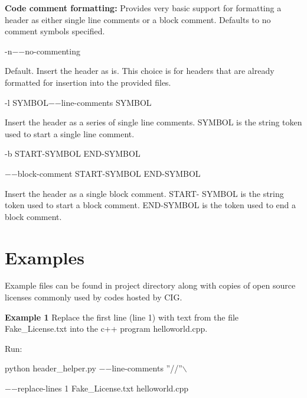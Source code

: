 \documentclass[11pt, oneside]{article}   	%
\begin{document}
\textbf{Code comment formatting:}\newline
Provides very basic support for formatting a header as either single line comments or a block comment. Defaults to no comment symbols specified.
\begin{addmargin}[5em]{2em}
 -n\space\space\space\space\space\space 	$-$$-$no-commenting   
	\begin{addmargin}[5em]{2em}
	Default. Insert the header as is. This choice is for headers that are already formatted for insertion into the provided files.
	\end{addmargin}
 -l  SYMBOL\space\space\space$-$$-$line-comments SYMBOL
	\begin{addmargin}[5em]{2em}
	Insert the header as a series of single line comments. SYMBOL is the string token used to start a single line comment.
	\end{addmargin}
  -b START-SYMBOL END-SYMBOL
	 \begin{addmargin}[3em]{2em}$-$$-$block-comment START-SYMBOL END-SYMBOL \end{addmargin}
	 \begin{addmargin}[5em]{2em}
	Insert the header as a single block comment. START- SYMBOL is the string token used to start a block comment. END-SYMBOL is the token used to end a block comment.
	\end{addmargin}
\end{addmargin}

\section{Examples}
Example files can be found in project directory along with copies of open source licenses commonly used by codes hosted by CIG.

\textbf{Example 1}\newline
Replace the first line (line 1) with text from the file {\selectfont Fake\_License.txt} into the c++ program {\selectfont helloworld.cpp}. 

Run:
\begin{addmargin}[5em]{2em}
{\selectfont python header\_helper.py $-$$-$line-comments \textquotedblright//\textquotedblright  \space $ \backslash$ 
\begin{addmargin}[2em]{2em}$-$$-$replace-lines 1 Fake\_License.txt helloworld.cpp \end{addmargin}
} 
\end{addmargin}
\end{document}
